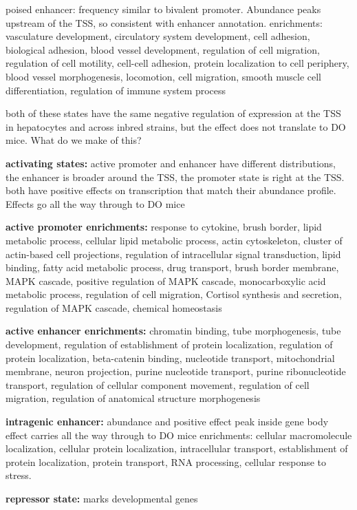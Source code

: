 \documentclass[10pt,letterpaper]{article}
\begin{document}
poised enhancer: frequency similar to bivalent promoter. Abundance peaks
upstream of the TSS, so consistent with enhancer annotation.
enrichments: vasculature development, circulatory system development,
cell adhesion, biological adhesion, blood vessel development, regulation
of cell migration, regulation of cell motility, cell-cell adhesion,
protein localization to cell periphery, blood vessel morphogenesis,
locomotion, cell migration, smooth muscle cell differentiation,
regulation of immune system process

both of these states have the same negative regulation of expression at
the TSS in hepatocytes and across inbred strains, but the effect does
not translate to DO mice. What do we make of this?

\textbf{activating states:} active promoter and enhancer have different
distributions, the enhancer is broader around the TSS, the promoter
state is right at the TSS. both have positive effects on transcription
that match their abundance profile. Effects go all the way through to DO
mice

\textbf{active promoter enrichments:} response to cytokine, brush
border, lipid metabolic process, cellular lipid metabolic process, actin
cytoskeleton, cluster of actin-based cell projections, regulation of
intracellular signal transduction, lipid binding, fatty acid metabolic
process, drug transport, brush border membrane, MAPK cascade, positive
regulation of MAPK cascade, monocarboxylic acid metabolic process,
regulation of cell migration, Cortisol synthesis and secretion,
regulation of MAPK cascade, chemical homeostasis

\textbf{active enhancer enrichments:} chromatin binding, tube
morphogenesis, tube development, regulation of establishment of protein
localization, regulation of protein localization, beta-catenin binding,
nucleotide transport, mitochondrial membrane, neuron projection, purine
nucleotide transport, purine ribonucleotide transport, regulation of
cellular component movement, regulation of cell migration, regulation of
anatomical structure morphogenesis

\textbf{intragenic enhancer:} abundance and positive effect peak inside
gene body effect carries all the way through to DO mice enrichments:
cellular macromolecule localization, cellular protein localization,
intracellular transport, establishment of protein localization, protein
transport, RNA processing, cellular response to stress.

\textbf{repressor state:} marks developmental genes
\end{document}
